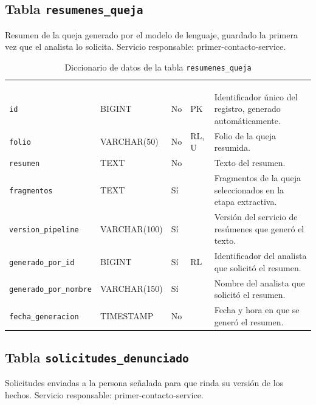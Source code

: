 \subsection{Tabla \texttt{resumenes\_queja}}
Resumen de la queja generado por el modelo de lenguaje, guardado la primera vez que el analista lo solicita. Servicio responsable: primer-contacto-service.


\footnotesize
\renewcommand{\arraystretch}{1.15}
\setlength{\tabcolsep}{4pt}
\begin{longtable}{|L{3.9cm}|L{2.4cm}|L{0.9cm}|L{1.2cm}|L{6.6cm}|}
	\hiderowcolors\caption{Diccionario de datos de la tabla \texttt{resumenes\_queja}}
	\label{tab:dic_resumenes_queja} \\ \showrowcolors
	\hline
	 &  &  &  &  \\
	\hline
	\endfirsthead
	\hline
	 &  &  &  &  \\
	\hline
	\endhead
		\texttt{id} & BIGINT & No & PK & Identificador único del registro, generado automáticamente. \\ \hline
		\texttt{folio} & VARCHAR(50) & No & RL, U & Folio de la queja resumida. \\ \hline
		\texttt{resumen} & TEXT & No &  & Texto del resumen. \\ \hline
		\texttt{fragmentos} & TEXT & Sí &  & Fragmentos de la queja seleccionados en la etapa extractiva. \\ \hline
		\texttt{version\_\allowbreak{}pipeline} & VARCHAR(100) & Sí &  & Versión del servicio de resúmenes que generó el texto. \\ \hline
		\texttt{generado\_\allowbreak{}por\_\allowbreak{}id} & BIGINT & Sí & RL & Identificador del analista que solicitó el resumen. \\ \hline
		\texttt{generado\_\allowbreak{}por\_\allowbreak{}nombre} & VARCHAR(150) & Sí &  & Nombre del analista que solicitó el resumen. \\ \hline
		\texttt{fecha\_\allowbreak{}generacion} & TIMESTAMP & No &  & Fecha y hora en que se generó el resumen. \\ \hline
\end{longtable}
\normalsize
\setlength{\tabcolsep}{6pt}
\renewcommand{\arraystretch}{1}

\subsection{Tabla \texttt{solicitudes\_denunciado}}
Solicitudes enviadas a la persona señalada para que rinda su versión de los hechos. Servicio responsable: primer-contacto-service.


